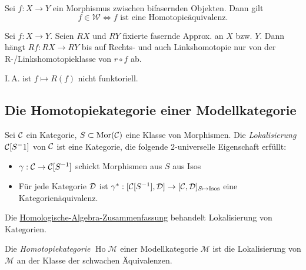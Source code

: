 \documentclass{cheat-sheet}
\newcommand{\Weak}{\mathcal{W}} %
\newcommand{\ModC}{\mathcal{M}} %
\DeclareMathOperator{\Ho}{Ho} %
\begin{document}
\begin{thm}[Whitehead]
  Sei $f : X \to Y$ ein Morphismus zwischen bifasernden Objekten. Dann gilt
  \[ f \in \Weak \iff \text{$f$ ist eine Homotopieäquivalenz.} \]
\end{thm}

\begin{lem}
  Sei $f : X \to Y$. Seien $RX$ und $RY$ fixierte fasernde Approx. an $X$ bzw. $Y$.
  Dann hängt $Rf : RX \to RY$ bis auf Rechts- und auch Linkshomotopie nur von der R-/Linkshomotopieklasse von $r \circ f$ ab.
\end{lem}

\begin{acht}
  I.\,A. ist $f \mapsto R(f)$ nicht funktoriell.
\end{acht}

\subsection{Die Homotopiekategorie einer Modellkategorie}



\begin{defn}
  Sei $\mathcal{C}$ ein Kategorie, $S \subset \operatorname{Mor}(\mathcal{C})$ eine Klasse von Morphismen. Die \emph{Lokalisierung} $\mathcal{C}[S^-1]$ von $\mathcal{C}$ ist eine Kategorie, die folgende 2-universelle Eigenschaft erfüllt:
  \begin{itemize}
    \item $\gamma : \mathcal{C} \to \mathcal{C}[S^{-1}]$ schickt Morphismen aus $S$ aus Isos
    \item Für jede Kategorie $\mathcal{D}$ ist $\gamma^* : [\mathcal{C}[S^{-1}], \mathcal{D}] \to [\mathcal{C}, \mathcal{D}]_{S \mapsto \text{Isos}}$ eine Kategorienäquivalenz.
  \end{itemize}
\end{defn}

\begin{bem}
  Die \href{http://timbaumann.info/uni-spicker/homoalg.pdf}{Homologische-Algebra-Zusammenfassung} behandelt Lokalisierung von Kategorien.
\end{bem}

\begin{defn}
  Die \emph{Homotopiekategorie} $\Ho \ModC$ einer Modellkategorie $\ModC$ ist die Lokalisierung von $\ModC$ an der Klasse der schwachen Äquivalenzen.
\end{defn}
\end{document}

